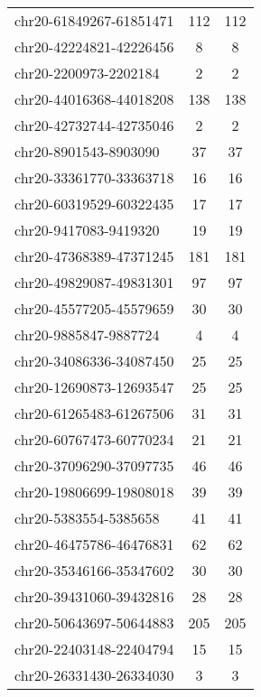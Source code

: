 \documentclass[10pt,letterpaper]{article}
\begin{document}
{\begin{longtable}{lSS}
	chr20-61849267-61851471 & 112    & 112                   \\
	chr20-42224821-42226456 & 8      & 8                     \\
	chr20-2200973-2202184   & 2      & 2                     \\
	chr20-44016368-44018208 & 138    & 138                   \\
	chr20-42732744-42735046 & 2      & 2                     \\
	chr20-8901543-8903090   & 37     & 37                    \\
	chr20-33361770-33363718 & 16     & 16                    \\
	chr20-60319529-60322435 & 17     & 17                    \\
	chr20-9417083-9419320   & 19     & 19                    \\
	chr20-47368389-47371245 & 181    & 181                   \\
	chr20-49829087-49831301 & 97     & 97                    \\
	chr20-45577205-45579659 & 30     & 30                    \\
	chr20-9885847-9887724   & 4      & 4                     \\
	chr20-34086336-34087450 & 25     & 25                    \\
	chr20-12690873-12693547 & 25     & 25                    \\
	chr20-61265483-61267506 & 31     & 31                    \\
	chr20-60767473-60770234 & 21     & 21                    \\
	chr20-37096290-37097735 & 46     & 46                    \\
	chr20-19806699-19808018 & 39     & 39                    \\
	chr20-5383554-5385658   & 41     & 41                    \\
	chr20-46475786-46476831 & 62     & 62                    \\
	chr20-35346166-35347602 & 30     & 30                    \\
	chr20-39431060-39432816 & 28     & 28                    \\
	chr20-50643697-50644883 & 205    & 205                   \\
	chr20-22403148-22404794 & 15     & 15                    \\
	chr20-26331430-26334030 & 3      & 3                     \\

\end{longtable}}
\end{document}
